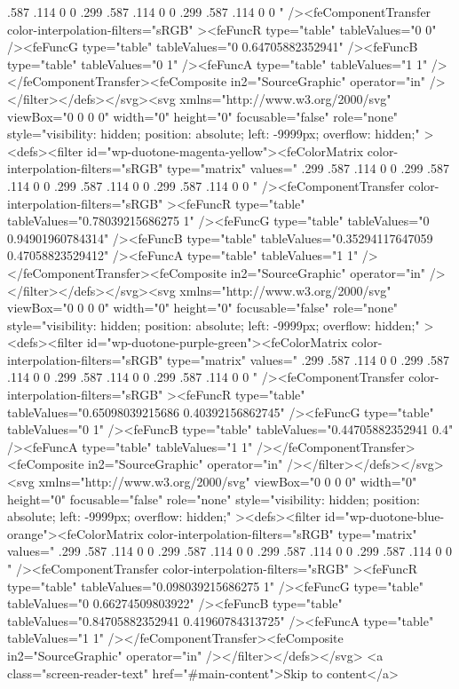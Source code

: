 {.587 .114 0 0 .299 .587 .114 0 0 .299 .587 .114 0 0 " /><feComponentTransfer color-interpolation-filters="sRGB" ><feFuncR type="table" tableValues="0 0" /><feFuncG type="table" tableValues="0 0.64705882352941" /><feFuncB type="table" tableValues="0 1" /><feFuncA type="table" tableValues="1 1" /></feComponentTransfer><feComposite in2="SourceGraphic" operator="in" /></filter></defs></svg><svg xmlns="http://www.w3.org/2000/svg" viewBox="0 0 0 0" width="0" height="0" focusable="false" role="none" style="visibility: hidden; position: absolute; left: -9999px; overflow: hidden;" ><defs><filter id="wp-duotone-magenta-yellow"><feColorMatrix color-interpolation-filters="sRGB" type="matrix" values=" .299 .587 .114 0 0 .299 .587 .114 0 0 .299 .587 .114 0 0 .299 .587 .114 0 0 " /><feComponentTransfer color-interpolation-filters="sRGB" ><feFuncR type="table" tableValues="0.78039215686275 1" /><feFuncG type="table" tableValues="0 0.94901960784314" /><feFuncB type="table" tableValues="0.35294117647059 0.47058823529412" /><feFuncA type="table" tableValues="1 1" /></feComponentTransfer><feComposite in2="SourceGraphic" operator="in" /></filter></defs></svg><svg xmlns="http://www.w3.org/2000/svg" viewBox="0 0 0 0" width="0" height="0" focusable="false" role="none" style="visibility: hidden; position: absolute; left: -9999px; overflow: hidden;" ><defs><filter id="wp-duotone-purple-green"><feColorMatrix color-interpolation-filters="sRGB" type="matrix" values=" .299 .587 .114 0 0 .299 .587 .114 0 0 .299 .587 .114 0 0 .299 .587 .114 0 0 " /><feComponentTransfer color-interpolation-filters="sRGB" ><feFuncR type="table" tableValues="0.65098039215686 0.40392156862745" /><feFuncG type="table" tableValues="0 1" /><feFuncB type="table" tableValues="0.44705882352941 0.4" /><feFuncA type="table" tableValues="1 1" /></feComponentTransfer><feComposite in2="SourceGraphic" operator="in" /></filter></defs></svg><svg xmlns="http://www.w3.org/2000/svg" viewBox="0 0 0 0" width="0" height="0" focusable="false" role="none" style="visibility: hidden; position: absolute; left: -9999px; overflow: hidden;" ><defs><filter id="wp-duotone-blue-orange"><feColorMatrix color-interpolation-filters="sRGB" type="matrix" values=" .299 .587 .114 0 0 .299 .587 .114 0 0 .299 .587 .114 0 0 .299 .587 .114 0 0 " /><feComponentTransfer color-interpolation-filters="sRGB" ><feFuncR type="table" tableValues="0.098039215686275 1" /><feFuncG type="table" tableValues="0 0.66274509803922" /><feFuncB type="table" tableValues="0.84705882352941 0.41960784313725" /><feFuncA type="table" tableValues="1 1" /></feComponentTransfer><feComposite in2="SourceGraphic" operator="in" /></filter></defs></svg>	<a class="screen-reader-text" href="#main-content">Skip to content</a>
	
}
